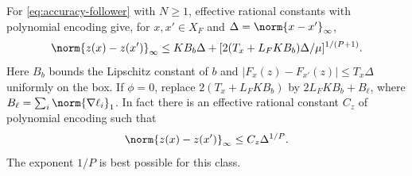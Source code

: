 \begin{proposition}
\label{prop:accuracy-response-modulus}
For \eqref{eq:accuracy-follower} with $N\ge1$, effective rational constants with
polynomial encoding give, for $x,x'\in X_F$ and
$\Delta=\norm{x-x'}_\infty$,
\begin{equation}\label{eq:response-modulus-basic}
 \norm{z(x)-z(x')}_\infty
 \le KB_b\Delta+
       [2(T_x+L_FKB_b)\Delta/\mu]^{1/(P+1)}.
\end{equation}
Here $B_b$ bounds the Lipschitz constant of $b$ and
$|F_x(z)-F_{x'}(z)|\le T_x\Delta$ uniformly on the box.
If $\phi=0$, replace $2(T_x+L_FKB_b)$ by
$2L_FKB_b+B_\ell$, where
$B_\ell=\sum_i\norm{\nabla\ell_i}_1$.
In fact there is an effective rational constant $C_z$ of polynomial
encoding such that
\begin{equation}\label{eq:response-modulus-sharp}
                  \norm{z(x)-z(x')}_\infty\le C_z\Delta^{1/P}.
\end{equation}
The exponent $1/P$ is best possible for this class.
\end{proposition}
